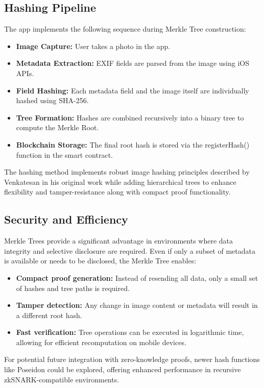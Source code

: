 \subsection{Hashing Pipeline}
The app implements the following sequence during Merkle Tree construction:
\begin{itemize}
    \item {\textbf{Image Capture:}} User takes a photo in the app.
    \item {\textbf{Metadata Extraction:}} EXIF fields are parsed from the image using iOS APIs.
    \item {\textbf{Field Hashing:}} Each metadata field and the image itself are individually hashed using SHA-256.
    \item {\textbf{Tree Formation:}} Hashes are combined recursively into a binary tree to compute the Merkle Root.
    \item {\textbf{Blockchain Storage:}} The final root hash is stored via the registerHash() function in the smart contract.
\end{itemize}

The hashing method implements robust image hashing principles described by Venkatesan \cite{robustImageHashing} in his original work while adding hierarchical trees to enhance flexibility and tamper-resistance along with compact proof functionality.

\subsection{Security and Efficiency}
Merkle Trees provide a significant advantage in environments where data integrity and selective disclosure are required. Even if only a subset of metadata is available or needs to be disclosed, the Merkle Tree enables:
\begin{itemize}
    \item {\textbf{Compact proof generation:}} Instead of resending all data, only a small set of hashes and tree paths is required.
    \item {\textbf{Tamper detection:}} Any change in image content or metadata will result in a different root hash.
    \item {\textbf{Fast verification:}} Tree operations can be executed in logarithmic time, allowing for efficient recomputation on mobile devices.
\end{itemize}
For potential future integration with zero-knowledge proofs, newer hash functions like Poseidon \cite{poseidon} could be explored, offering enhanced performance in recursive zkSNARK-compatible environments.

